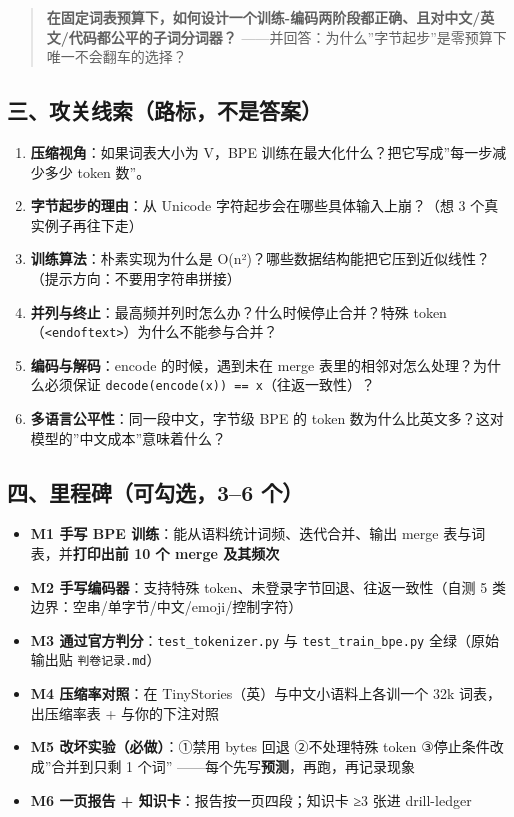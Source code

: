 \documentclass[
  chinese,
  11pt,
]{ctexart}
\providecommand{\tightlist}{%
  \setlength{\itemsep}{0pt}\setlength{\parskip}{0pt}}
\begin{document}
\begin{quote}
\textbf{在固定词表预算下，如何设计一个训练-编码两阶段都正确、且对中文/英文/代码都公平的子词分词器？} ------并回答：为什么''字节起步''是零预算下唯一不会翻车的选择？
\end{quote}

\subsection{三、攻关线索（路标，不是答案）}\label{ux4e09ux653bux5173ux7ebfux7d22ux8defux6807ux4e0dux662fux7b54ux6848}

\begin{enumerate}
\def\labelenumi{\arabic{enumi}.}
\tightlist
\item
  \textbf{压缩视角}：如果词表大小为 V，BPE 训练在最大化什么？把它写成''每一步减少多少 token 数''。
\item
  \textbf{字节起步的理由}：从 Unicode 字符起步会在哪些具体输入上崩？（想 3 个真实例子再往下走）
\item
  \textbf{训练算法}：朴素实现为什么是 O(n²)？哪些数据结构能把它压到近似线性？（提示方向：不要用字符串拼接）
\item
  \textbf{并列与终止}：最高频并列时怎么办？什么时候停止合并？特殊 token（\texttt{\textless{}\textbar{}endoftext\textbar{}\textgreater{}}）为什么不能参与合并？
\item
  \textbf{编码与解码}：encode 的时候，遇到未在 merge 表里的相邻对怎么处理？为什么必须保证 \texttt{decode(encode(x))\ ==\ x}（往返一致性）？
\item
  \textbf{多语言公平性}：同一段中文，字节级 BPE 的 token 数为什么比英文多？这对模型的''中文成本''意味着什么？
\end{enumerate}

\subsection{四、里程碑（可勾选，3--6 个）}\label{ux56dbux91ccux7a0bux7891ux53efux52feux900936-ux4e2a}

\begin{itemize}
\tightlist
\item[$\square$]
  \textbf{M1 手写 BPE 训练}：能从语料统计词频、迭代合并、输出 merge 表与词表，并\textbf{打印出前 10 个 merge 及其频次}
\item[$\square$]
  \textbf{M2 手写编码器}：支持特殊 token、未登录字节回退、往返一致性（自测 5 类边界：空串/单字节/中文/emoji/控制字符）
\item[$\square$]
  \textbf{M3 通过官方判分}：\texttt{test\_tokenizer.py} 与 \texttt{test\_train\_bpe.py} 全绿（原始输出贴 \texttt{判卷记录.md}）
\item[$\square$]
  \textbf{M4 压缩率对照}：在 TinyStories（英）与中文小语料上各训一个 32k 词表，出压缩率表 + 与你的下注对照
\item[$\square$]
  \textbf{M5 改坏实验（必做）}：①禁用 bytes 回退 ②不处理特殊 token ③停止条件改成''合并到只剩 1 个词'' ------每个先写\textbf{预测}，再跑，再记录现象
\item[$\square$]
  \textbf{M6 一页报告 + 知识卡}：报告按一页四段；知识卡 ≥3 张进 drill-ledger
\end{itemize}
\end{document}
